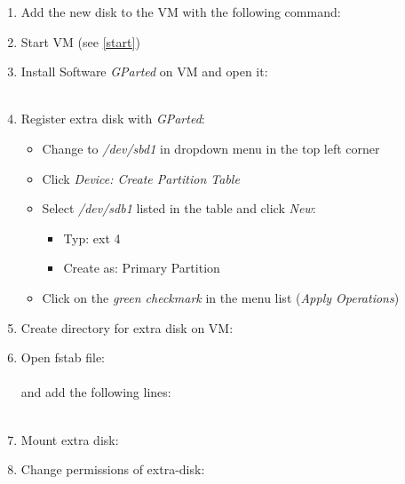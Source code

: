 \begin{enumerate}
\item Add the new disk to the VM with the following command:\\
\item Start VM (see \ref{start})
\item Install Software \emph{GParted} on VM and open it:\\
\\
\item Register extra disk with \emph{GParted}:
\begin{itemize}
\item Change to \emph{/dev/sbd1} in dropdown menu in the top left corner
\item Click \emph{Device: Create Partition Table}
\item Select \emph{/dev/sdb1} listed in the table and click \emph{New}:
\begin{itemize}
\item Typ: ext 4
\item Create as: Primary Partition
\end{itemize}
\item Click on the \emph{green checkmark} in the menu list (\emph{Apply Operations})
\end{itemize}
\item Create directory for extra disk on VM:\\
\item Open fstab file:\\
\\
and add the following lines:\\
\\
\item Mount extra disk:\\
\item Change permissions of extra-disk:\\
\\
\end{enumerate}
    
